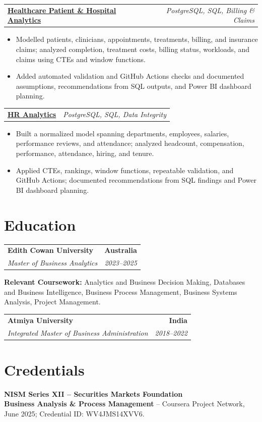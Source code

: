 \documentclass[letterpaper,10pt]{article}
\makeatletter
\newcommand{\role}[4]{%
  \begin{tabularx}{\textwidth}{@{}Xr@{}}
    \textbf{#1} & \textbf{#2} \\
    \textit{#3} & \textit{#4}
  \end{tabularx}\vspace{-1pt}
}
\newcommand{\project}[2]{%
  \begin{tabularx}{\textwidth}{@{}Xr@{}}
    \textbf{#1} & \textit{#2}
  \end{tabularx}\vspace{-1pt}
}
\makeatother
\begin{document}
\project{\href{https://github.com/jainalimehta/Healthcare-Analytics}{Healthcare Patient \& Hospital Analytics}}{PostgreSQL, SQL, Billing \& Claims}
\begin{itemize}
  \item Modelled patients, clinicians, appointments, treatments, billing, and insurance claims; analyzed completion, treatment costs, billing status, workloads, and claims using CTEs and window functions.
  \item Added automated validation and GitHub Actions checks and documented assumptions, recommendations from SQL outputs, and Power BI dashboard planning.
\end{itemize}
\vspace{1pt}

\project{\href{https://github.com/jainalimehta/HR-Analytics}{HR Analytics}}{PostgreSQL, SQL, Data Integrity}
\begin{itemize}
  \item Built a normalized model spanning departments, employees, salaries, performance reviews, and attendance; analyzed headcount, compensation, performance, attendance, hiring, and tenure.
  \item Applied CTEs, rankings, window functions, repeatable validation, and GitHub Actions; documented recommendations from SQL findings and Power BI dashboard planning.
\end{itemize}

\section{Education}
\role{Edith Cowan University}{Australia}{Master of Business Analytics}{2023--2025}
\small\textbf{Relevant Coursework:} Analytics and Business Decision Making, Databases and Business Intelligence, Business Process Management, Business Systems Analysis, Project Management.\\[2pt]
\role{Atmiya University}{India}{Integrated Master of Business Administration}{2018--2022}

\section{Credentials}
\small\textbf{NISM Series XII -- Securities Markets Foundation}\\[-0.2pt]
\small\textbf{Business Analysis \& Process Management} -- Coursera Project Network, June 2025; Credential ID: WV4JMS14XVV6.
\end{document}
